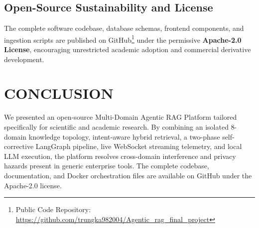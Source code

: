 \documentclass[conference]{IEEEtran}
\begin{document}
\subsection{Open-Source Sustainability and License}
The complete software codebase, database schemas, frontend components, and ingestion scripts are published on GitHub\footnote{Public Code Repository: \url{https://github.com/trungka982004/Agentic_rag_final_project}} under the permissive \textbf{Apache-2.0 License}, encouraging unrestricted academic adoption and commercial derivative development.

\section{CONCLUSION}
We presented an open-source Multi-Domain Agentic RAG Platform tailored specifically for scientific and academic research. By combining an isolated 8-domain knowledge topology, intent-aware hybrid retrieval, a two-phase self-corrective LangGraph pipeline, live WebSocket streaming telemetry, and local LLM execution, the platform resolves cross-domain interference and privacy hazards present in generic enterprise tools. The complete codebase, documentation, and Docker orchestration files are available on GitHub under the Apache-2.0 license.
\end{document}
